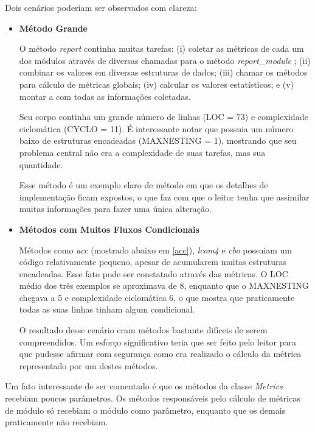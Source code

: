 Dois cenários poderiam ser observados com clareza:

\begin{itemize}
\item 
\textbf{Método Grande}

O método \textit{report} continha muitas tarefas: (i) coletar as métricas de cada um dos módulos
através de diversas chamadas para o método \textit{report\_module} ; (ii) combinar os valores em 
diversas estruturas de dados; (iii) chamar os métodos para cálculo de métricas globais; (iv)
calcular os valores estatísticos; e (v) montar a com todas as informações coletadas.

Seu corpo continha um grande número de linhas (LOC = 73) e complexidade ciclomática (CYCLO = 11).
É interessante notar que possuia um número baixo de estruturas encadeadas (MAXNESTING = 1), mostrando
que seu problema central não era a complexidade de suas tarefas, mas sua quantidade.

Esse método é um exemplo claro de método em que os detalhes de implementação ficam expostos, o que 
faz com que o leitor tenha que assimilar muitas informações para fazer uma única alteração.

\item
\textbf{Métodos com Muitos Fluxos Condicionais}

Métodos como \textit{acc} (mostrado abaixo em \ref{acc}), \textit{lcom4} e \textit{cbo}
possuiam um código relativamente pequeno, apesar de acumularem muitas estruturas encadeadas. 
Esse fato pode ser constatado através das métricas. O LOC médio dos três exemplos se aproximava de 8, 
enquanto que o MAXNESTING chegava a 5 e complexidade ciclomática 6, o que mostra que
praticamente todas as suas linhas tinham algum condicional.

O resultado desse cenário eram métodos bastante difíceis de serem compreendidos. 
Um esforço significativo teria que ser feito pelo leitor para que  pudesse afirmar
com segurança como era realizado o cálculo da métrica representado por um destes
métodos.



\end{itemize}

Um fato interessante de ser comentado é que os métodos da classe \textit{Metrics}
recebiam poucos parâmetros. Os métodos responsáveis pelo cálculo de métricas de módulo
só recebiam o módulo como parâmetro, enquanto que os demais praticamente não recebiam.

